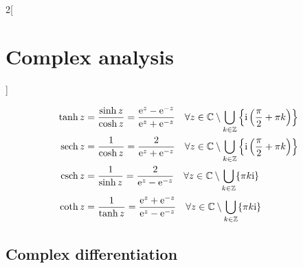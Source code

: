 \documentclass[../../../main.tex]{subfiles}
\begin{document}
\begin{multicols}{2}[\section{Complex analysis}]
\begin{definition}
    \begin{align*}
      \tanh z & = \frac{\sinh z}{\cosh z}=\frac{\exp{z}-\exp{-z}}{\exp{z}+\exp{-z}}\quad \forall z\in\CC\setminus\bigcup_{k\in\ZZ}\left\{\ii\left(\frac{\pi}{2}+\pi k\right)\right\} \\
      \sech z & = \frac{1}{\cosh z}=\frac{2}{\exp{z}+\exp{-z}}\quad \forall z\in\CC\setminus\bigcup_{k\in\ZZ}\left\{\ii\left(\frac{\pi}{2}+\pi k\right)\right\}                      \\
      \csch z & = \frac{1}{\sinh z}=\frac{2}{\exp{z}-\exp{-z}}\quad\forall z\in\CC\setminus\bigcup_{k\in\ZZ}\{\pi k\ii\}                                                             \\
      \coth z & = \frac{1}{\tanh z}=\frac{\exp{z}+\exp{-z}}{\exp{z}-\exp{-z}}\quad\forall z\in\CC\setminus\bigcup_{k\in\ZZ}\{\pi k\ii\}
    \end{align*}
  \end{definition}
  \subsection{Complex differentiation}

\end{multicols}
\end{document}
